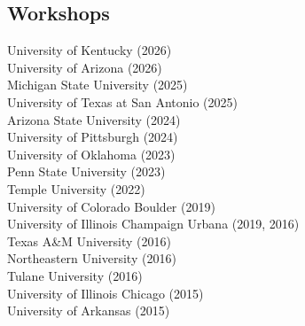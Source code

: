 \documentclass[]{deedy-resume-openfont}
\begin{document}
\begin{minipage}[t]{0.49\textwidth} 

\subsection{Workshops}
University of Kentucky (2026) \\
University of Arizona (2026) \\
Michigan State University (2025) \\
University of Texas at San Antonio (2025) \\
Arizona State University (2024) \\ 
University of Pittsburgh (2024) \\
University of Oklahoma (2023) \\
Penn State University (2023) \\
Temple University (2022) \\
University of Colorado Boulder (2019) \\
University of Illinois Champaign Urbana (2019, 2016) \\
Texas A\&M University (2016) \\
Northeastern University (2016) \\
Tulane University (2016) \\
University of Illinois Chicago (2015) \\
University of Arkansas (2015) \\

\end{minipage}


\end{document}
